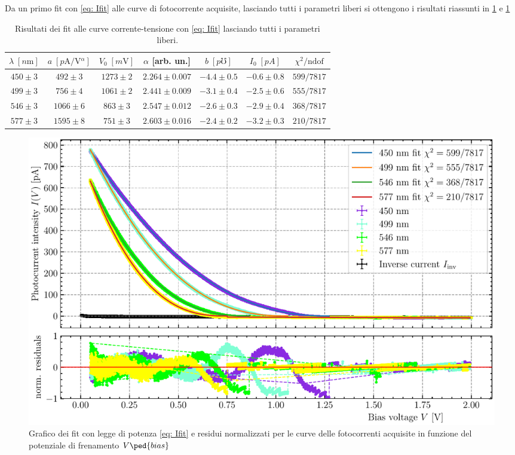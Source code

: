 \documentclass[10pt, a4paper, italian]{article}
\begin{document}
Da un primo fit con \cref{eq: Ifit} alle curve di fotocorrente acquisite,
lasciando tutti i parametri liberi si ottengono i risultati riassunti in
\cref{tab: Ifree} e \cref{fig: Ifree}
\begin{table}
\centering
\begin{tabular}{ccccccc}
\toprule
$\lambda \; [\si{n\m}]$ & $a \; [\si{p\A/\V^\alpha}] $ & $V_0 \; [\si{m\V}]$ &
$\alpha$ [arb. un.] & $b \; [\si{p\mho}]$ & $I_0 \; [\si{pA}]$ & $\chi^2/\text{ndof}$ \\
\midrule
$450 \pm 3$ & $492 \pm 3$ & $1273 \pm 2$ & $2.264 \pm 0.007$ & $-4.4 \pm 0.5$ &
$-0.6 \pm 0.8$ & $599/7817$ \\
$499 \pm 3$ & $756 \pm 4$ & $1061 \pm 2$ & $2.441 \pm 0.009$ & $-3.1 \pm 0.4$ &
$-2.5 \pm 0.6$ & $555/7817$ \\
$546 \pm 3$ & $1066 \pm 6$ & $863 \pm 3$ & $2.547 \pm 0.012$ & $-2.6 \pm 0.3$ &
$-2.9 \pm 0.4$ & $368/7817$ \\
$577 \pm 3$ & $1595 \pm 8$ & $751 \pm 3$ & $2.603 \pm 0.016$ & $-2.4 \pm 0.2$ &
$-3.2 \pm 0.3$ & $210/7817$ \\
\bottomrule
\end{tabular}
\caption{Risultati dei fit alle curve corrente-tensione con \cref{eq: Ifit}
lasciando tutti i parametri liberi.
\label{tab: Ifree}}
\end{table}

\begin{figure}[htbp]
    \centering
	\includegraphics[width=\textwidth]{IV}
    \caption{Grafico dei fit con legge di potenza \cref{eq: Ifit} e residui
    normalizzati per le curve delle fotocorrenti acquisite in funzione del
    potenziale di frenamento $V\ped{bias}$
    \label{fig: Ifree}}
\end{figure}
\end{document}

